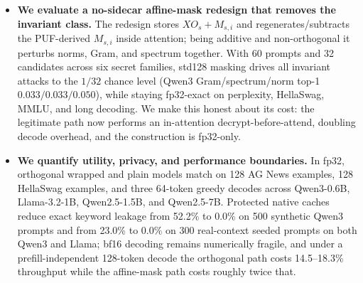 \begin{itemize}
    \item \textbf{We evaluate a no-sidecar affine-mask redesign that removes the invariant class.} The redesign stores $XO_s+M_{s,i}$ and regenerates/subtracts the PUF-derived $M_{s,i}$ inside attention; being additive and non-orthogonal it perturbs norms, Gram, and spectrum together. With 60 prompts and 32 candidates across six secret families, std128 masking drives all invariant attacks to the $1/32$ chance level (Qwen3 Gram/spectrum/norm top-1 $0.033/0.033/0.050$), while staying fp32-exact on perplexity, HellaSwag, MMLU, and long decoding. We make this honest about its cost: the legitimate path now performs an in-attention decrypt-before-attend, doubling decode overhead, and the construction is fp32-only.
    \item \textbf{We quantify utility, privacy, and performance boundaries.} In fp32, orthogonal wrapped and plain models match on 128 AG News examples, 128 HellaSwag examples, and three 64-token greedy decodes across Qwen3-0.6B, Llama-3.2-1B, Qwen2.5-1.5B, and Qwen2.5-7B. Protected native caches reduce exact keyword leakage from 52.2\% to 0.0\% on 500 synthetic Qwen3 prompts and from 23.0\% to 0.0\% on 300 real-context seeded prompts on both Qwen3 and Llama; bf16 decoding remains numerically fragile, and under a prefill-independent 128-token decode the orthogonal path costs 14.5--18.3\% throughput while the affine-mask path costs roughly twice that.
\end{itemize}
